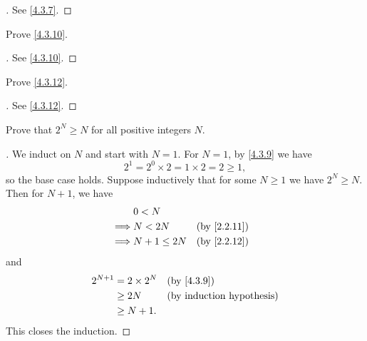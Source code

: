 \begin{proof}[]
  See \cref{4.3.7}.
\end{proof}

\begin{ex}\label{ex:4.3.3}
  Prove \cref{4.3.10}.
\end{ex}

\begin{proof}[]
  See \cref{4.3.10}.
\end{proof}

\begin{ex}\label{ex:4.3.4}
  Prove \cref{4.3.12}.
\end{ex}

\begin{proof}[]
  See \cref{4.3.12}.
\end{proof}

\begin{ex}\label{ex:4.3.5}
  Prove that \(2^N \geq N\) for all positive integers \(N\).
\end{ex}

\begin{proof}[]
  We induct on \(N\) and start with \(N = 1\).
  For \(N = 1\), by \cref{4.3.9} we have
  \[
    2^1 = 2^0 \times 2 = 1 \times 2 = 2 \geq 1,
  \]
  so the base case holds.
  Suppose inductively that for some \(N \geq 1\) we have \(2^N \geq N\).
  Then for \(N + 1\), we have
  \begin{align*}
             & 0 < N                          \\
    \implies & N < 2N        &  & \by{2.2.11} \\
    \implies & N + 1 \leq 2N &  & \by{2.2.12}
  \end{align*}
  and
  \begin{align*}
    2^{N + 1} & = 2 \times 2^N &  & \by{4.3.9} \\
              & \geq 2N        &  & \byIH      \\
              & \geq N + 1.
  \end{align*}
  This closes the induction.
\end{proof}
